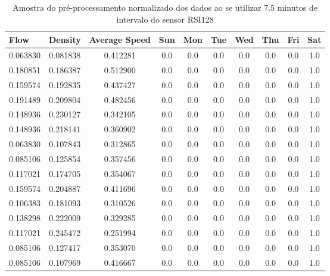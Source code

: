 \begin{table}[h]
    \begin{tabular}{cccccccccc}
    \toprule
    \multicolumn{1}{l}{\textbf{Flow}} & \multicolumn{1}{l}{\textbf{Density}} & \multicolumn{1}{l}{\textbf{Average Speed}} & \multicolumn{1}{l}{\textbf{Sun}} &
    \multicolumn{1}{l}{\textbf{Mon}} & \multicolumn{1}{l}{\textbf{Tue}} & \multicolumn{1}{l}{\textbf{Wed}} & \multicolumn{1}{l}{\textbf{Thu}} &
    \multicolumn{1}{l}{\textbf{Fri}} &
    \multicolumn{1}{l}{\textbf{Sat}} \\
    \midrule
    0.063830 & 0.081838 & 0.412281 & 0.0 & 0.0 & 0.0 & 0.0 & 0.0 & 0.0 & 1.0 \\
    \midrule
    0.180851 & 0.186387 & 0.512900 & 0.0 & 0.0 & 0.0 & 0.0 & 0.0 & 0.0 & 1.0 \\
    \midrule
    0.159574 & 0.192835 & 0.437427 & 0.0 & 0.0 & 0.0 & 0.0 & 0.0 & 0.0 & 1.0 \\
    \midrule
    0.191489 & 0.209804 & 0.482456 & 0.0 & 0.0 & 0.0 & 0.0 & 0.0 & 0.0 & 1.0 \\
    \midrule
    0.148936 & 0.230127 & 0.342105 & 0.0 & 0.0 & 0.0 & 0.0 & 0.0 & 0.0 & 1.0 \\
    \midrule
    0.148936 & 0.218141 & 0.360902 & 0.0 & 0.0 & 0.0 & 0.0 & 0.0 & 0.0 & 1.0 \\
    \midrule
    0.063830 & 0.107843 & 0.312865 & 0.0 & 0.0 & 0.0 & 0.0 & 0.0 & 0.0 & 1.0 \\
    \midrule
    0.085106 & 0.125854 & 0.357456 & 0.0 & 0.0 & 0.0 & 0.0 & 0.0 & 0.0 & 1.0 \\
    \midrule
    0.117021 & 0.174705 & 0.354067 & 0.0 & 0.0 & 0.0 & 0.0 & 0.0 & 0.0 & 1.0 \\
    \midrule
    0.159574 & 0.204887 & 0.411696 & 0.0 & 0.0 & 0.0 & 0.0 & 0.0 & 0.0 & 1.0 \\
    \midrule
    0.106383 & 0.181093 & 0.310526 & 0.0 & 0.0 & 0.0 & 0.0 & 0.0 & 0.0 & 1.0 \\
    \midrule
    0.138298 & 0.222009 & 0.329285 & 0.0 & 0.0 & 0.0 & 0.0 & 0.0 & 0.0 & 1.0 \\
    \midrule
    0.117021 & 0.245472 & 0.251994 & 0.0 & 0.0 & 0.0 & 0.0 & 0.0 & 0.0 & 1.0 \\
    \midrule
    0.085106 & 0.127417 & 0.353070 & 0.0 & 0.0 & 0.0 & 0.0 & 0.0 & 0.0 & 1.0 \\
    \midrule
    0.085106 & 0.107969 & 0.416667 & 0.0 & 0.0 & 0.0 & 0.0 & 0.0 & 0.0 & 1.0 \\
    \bottomrule
    \end{tabular}
    \label{table:data_pre_norm}
    \caption{Amostra do pré-processamento normalizado dos dados ao se utilizar 7.5 minutos de intervalo do sensor RSI128}
\end{table}

